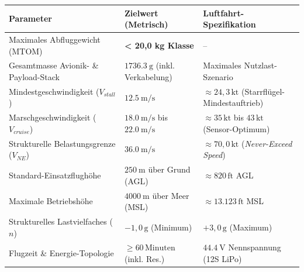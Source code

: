\documentclass[10pt,a4paper]{article}
\begin{document}
\begin{small}
\begin{tabular}{p{5.5cm} p{4.5cm} p{4.5cm}}
    \textbf{Parameter} & \textbf{Zielwert (Metrisch)} & \textbf{Luftfahrt-Spezifikation} \\
    \midrule
    Maximales Abfluggewicht (MTOM) & \textbf{< 20,0 kg Klasse} & -- \\
    Gesamtmasse Avionik- \& Payload-Stack & $\SI{1736.3}{\g}$ (inkl. Verkabelung) & Maximales Nutzlast-Szenario \\
    Mindestgeschwindigkeit ($V_{stall}$) & $\SI{12.5}{\m/\s}$ & $\approx 24{,}3\,\text{kt}$ (Starrflügel-Mindestauftrieb) \\
    Marschgeschwindigkeit ($V_{cruise}$) & $\SI{18.0}{\m/\s}$ bis $\SI{22.0}{\m/\s}$ & $\approx 35\,\text{kt}$ bis $43\,\text{kt}$ (Sensor-Optimum) \\
    Strukturelle Belastungsgrenze ($V_{NE}$) & $\SI{36.0}{\m/\s}$ & $\approx 70{,}0\,\text{kt}$ (\textit{Never-Exceed Speed}) \\
    Standard-Einsatzflughöhe & $\SI{250}{\m}$ über Grund (AGL) & $\approx 820\,\text{ft}$ AGL \\
    Maximale Betriebshöhe & $\SI{4000}{\m}$ über Meer (MSL) & $\approx 13.123\,\text{ft}$ MSL \\
    Strukturelles Lastvielfaches ($n$) & $-1{,}0\,\text{g}$ (Minimum) & $+3{,}0\,\text{g}$ (Maximum) \\
    Flugzeit \& Energie-Topologie & $\ge 60\,\text{Minuten}$ (inkl. Res.) & $\SI{44.4}{\V}$ Nennspannung (12S LiPo) \\
    \bottomrule
\end{tabular}
\end{small}
\newpage
\vspace{0.3cm}
\end{document}
